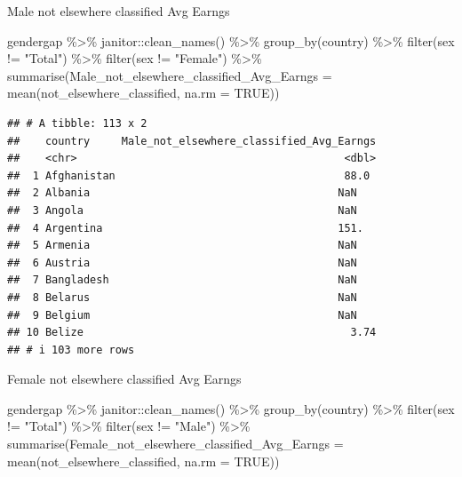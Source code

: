 \documentclass[
]{article}
\newenvironment{Shaded}{\begin{snugshade}}{\end{snugshade}}
\newcommand{\AttributeTok}[1]{\textcolor[rgb]{0.77,0.63,0.00}{#1}}
\newcommand{\ConstantTok}[1]{\textcolor[rgb]{0.00,0.00,0.00}{#1}}
\newcommand{\FunctionTok}[1]{\textcolor[rgb]{0.00,0.00,0.00}{#1}}
\newcommand{\NormalTok}[1]{#1}
\newcommand{\SpecialCharTok}[1]{\textcolor[rgb]{0.00,0.00,0.00}{#1}}
\newcommand{\StringTok}[1]{\textcolor[rgb]{0.31,0.60,0.02}{#1}}
\begin{document}
Male not elsewhere classified Avg Earngs

\begin{Shaded}
\begin{Highlighting}[]
\NormalTok{gendergap }\SpecialCharTok{\%\textgreater{}\%}
\NormalTok{  janitor}\SpecialCharTok{::}\FunctionTok{clean\_names}\NormalTok{() }\SpecialCharTok{\%\textgreater{}\%}
  \FunctionTok{group\_by}\NormalTok{(country) }\SpecialCharTok{\%\textgreater{}\%} 
   \FunctionTok{filter}\NormalTok{(sex }\SpecialCharTok{!=} \StringTok{"Total"}\NormalTok{) }\SpecialCharTok{\%\textgreater{}\%}
  \FunctionTok{filter}\NormalTok{(sex }\SpecialCharTok{!=} \StringTok{"Female"}\NormalTok{) }\SpecialCharTok{\%\textgreater{}\%}
  \FunctionTok{summarise}\NormalTok{(}\AttributeTok{Male\_not\_elsewhere\_classified\_Avg\_Earngs =} \FunctionTok{mean}\NormalTok{(not\_elsewhere\_classified, }\AttributeTok{na.rm =} \ConstantTok{TRUE}\NormalTok{))}
\end{Highlighting}
\end{Shaded}

\begin{verbatim}
## # A tibble: 113 x 2
##    country     Male_not_elsewhere_classified_Avg_Earngs
##    <chr>                                          <dbl>
##  1 Afghanistan                                    88.0 
##  2 Albania                                       NaN   
##  3 Angola                                        NaN   
##  4 Argentina                                     151.  
##  5 Armenia                                       NaN   
##  6 Austria                                       NaN   
##  7 Bangladesh                                    NaN   
##  8 Belarus                                       NaN   
##  9 Belgium                                       NaN   
## 10 Belize                                          3.74
## # i 103 more rows
\end{verbatim}

Female not elsewhere classified Avg Earngs

\begin{Shaded}
\begin{Highlighting}[]
\NormalTok{gendergap }\SpecialCharTok{\%\textgreater{}\%}
\NormalTok{  janitor}\SpecialCharTok{::}\FunctionTok{clean\_names}\NormalTok{() }\SpecialCharTok{\%\textgreater{}\%}
  \FunctionTok{group\_by}\NormalTok{(country) }\SpecialCharTok{\%\textgreater{}\%} 
   \FunctionTok{filter}\NormalTok{(sex }\SpecialCharTok{!=} \StringTok{"Total"}\NormalTok{) }\SpecialCharTok{\%\textgreater{}\%}
  \FunctionTok{filter}\NormalTok{(sex }\SpecialCharTok{!=} \StringTok{"Male"}\NormalTok{) }\SpecialCharTok{\%\textgreater{}\%}
  \FunctionTok{summarise}\NormalTok{(}\AttributeTok{Female\_not\_elsewhere\_classified\_Avg\_Earngs =} \FunctionTok{mean}\NormalTok{(not\_elsewhere\_classified, }\AttributeTok{na.rm =} \ConstantTok{TRUE}\NormalTok{))}
\end{Highlighting}
\end{Shaded}
\end{document}
